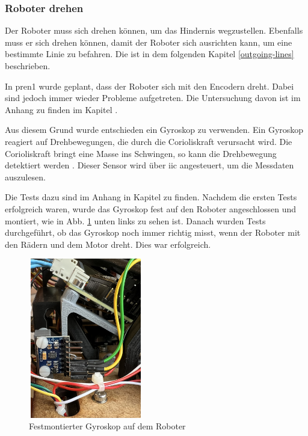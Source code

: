 \subsubsection{Roboter drehen}

Der Roboter muss sich drehen können, um das Hindernis wegzustellen. Ebenfalls muss er sich drehen können, damit der Roboter sich ausrichten kann, um eine bestimmte Linie zu befahren. Die ist in dem folgenden Kapitel \ref{outgoing-lines} beschrieben.

In \acrshort{pren1} wurde geplant, dass der Roboter sich mit den Encodern dreht. Dabei sind jedoch immer wieder Probleme aufgetreten. Die Untersuchung davon ist im Anhang zu finden im Kapitel .

Aus diesem Grund wurde entschieden ein Gyroskop zu verwenden.
 Ein Gyroskop reagiert auf Drehbewegungen, die durch die Corioliskraft verursacht wird. Die Corioliskraft bringt eine Masse ins Schwingen, so kann die Drehbewegung detektiert werden \parencite{zielke2025}. Dieser Sensor wird über \acrshort{iic} angesteuert, um die Messdaten auszulesen. 

Die Tests dazu sind im Anhang in Kapitel  zu finden. Nachdem die ersten Tests erfolgreich waren, wurde das Gyroskop fest auf den Roboter angeschlossen und montiert, wie in Abb. \ref{fig:Gyroskop auf dem Roboter} unten links zu sehen ist. Danach wurden Tests durchgeführt, ob das Gyroskop noch immer richtig misst, wenn der Roboter mit den Rädern und dem Motor dreht. Dies war erfolgreich.


\begin{figure}[H]
\centering
\includegraphics[width=5cm, height=7cm]{assets/ET/Gyroskop/Gyro_Montiert.jpeg}
\caption{Festmontierter Gyroskop auf dem Roboter}
\label{fig:Gyroskop auf dem Roboter}
\end{figure}

